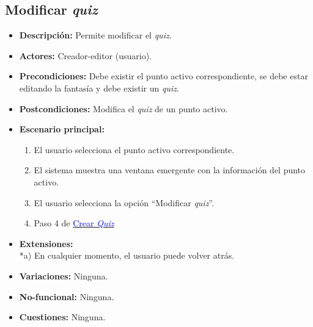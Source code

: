 \subsection{Modificar \textit{quiz}}
\begin{itemize}
	\item \textbf{Descripción:} Permite modificar el \textit{quiz}.
	\item \textbf{Actores:} Creador-editor (usuario).
	\item \textbf{Precondiciones:} Debe existir el punto activo correspondiente, se debe estar editando la fantasía y debe existir un \textit{quiz}.
	\item \textbf{Postcondiciones:} Modifica el \textit{quiz} de un punto activo.
	\item \textbf{Escenario principal:}
	\begin{enumerate}
		\item El usuario selecciona el punto activo correspondiente.
		\item El sistema muestra una ventana emergente con la información del punto activo.
		\item El usuario selecciona la opción ``Modificar \textit{quiz}''.
		\item Paso 4 de \hyperlink{crearquiz}{\textcolor{blue}{Crear \textit{Quiz}}}
	\end{enumerate}
	\item \textbf{Extensiones:} \\ *a) En cualquier momento, el usuario puede volver atrás.
	\item \textbf{Variaciones:} Ninguna.
	\item \textbf{No-funcional:} Ninguna.
	\item \textbf{Cuestiones:} Ninguna.
\end{itemize}

